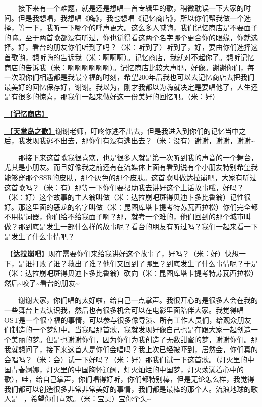 \documentclass[]{ctexbook}
\begin{document}
  接下来有一个难题，就是还是想唱一首专辑里的歌，稍微耽误一下大家的时间。但是我想唱，我想唱《嗨》，我也想唱《记忆商店》，所以你们帮我做一个选择，等一下，我听一下哪个的呼声更大。这么多人喊嗨，我们记忆商店是不要面子的嘛。至于两首歌都没有听过，你也觉得看这两个名字哪个更合你的眼缘，你就选择。好，看台的朋友你们听到了吗？（米：听到了）听到了，好，要由你们选择这首歌哟，想听嗨的告诉我（米：啊啊啊）。记忆商店，我就对不起你了。想听记忆商店的告诉我（米：啊啊啊啊啊啊）。记忆商店比较大声耶，好像。谢谢你们，每一次跟你们相遇都是我最幸福的时刻，希望200年后我也可以去记忆商店去把我们最美好的回忆保存好，谢谢。我以为，刚才我都以为嗨就决定是要唱他了，人生还是有很多的惊喜，那我们一起来做好这一份美好的回忆吧。（米：好）

\hyperref[the-memory-store]{🎵【\textbf{记忆商店}】}

\hyperref[haven-song]{🎵【\textbf{天堂岛之歌}】}谢谢老师，叮咚你逃不出去，但是我进入到你们的记忆当中之后，我发现我逃不出去，那你们有没有逃出去？（米：没有）谢谢，谢谢，谢谢\textasciitilde{}

  那接下来这首歌我很喜欢，也是很多人就是第一次听到我的声音的一个舞台，尤其是小朋友。而且好像我之前还有在流媒体上面有看到说有个小朋友特别希望我能够穿那个SSR的皮肤，那个灰色的那个皮肤。这首歌叫做达拉崩吧，大家有听过这首歌吗？（米：有）那等一下你们要帮助我去讲好这个土话故事哦，好吗？（米：好）这个故事的主人翁叫做（米：达拉崩吧斑得贝迪卜多比鲁翁）记性很好。那这里面的恶龙的名字叫做（米：昆图库塔卡提考特苏瓦西拉松）你们完全都不用提词器，你们给不给我面子啊？那，就考一个难的，他们回到的那个城市叫做？那到底是发生一部什么样的故事呢？看台的朋友有听过吗？我们一起来看一下是发生了什么事情吧？

\hyperref[dalabengba]{🎵【\textbf{达拉崩吧}】}现在需要你们来给我讲好这个故事了，好吗？（米：好）快想一下，是谁打败了谁？救出了谁？他们又回到了哪里？到底发生了什么事情呢？于是（米：达拉崩吧斑得贝迪卜多比鲁翁）砍向（米：昆图库塔卡提考特苏瓦西拉松）然后\textasciitilde 咬了\textasciitilde 看台的朋友\textasciitilde{}

  谢谢大家，你们唱的太好啦，给自己一点掌声。我很开心的是很多人会在我的一些舞台上去认识我，然后也有很多机会可以在电影里面陪伴大家。我觉得唱OST是一个很幸福的事情，可以参与很多像导演、所有工作人员们，给观众朋友们制造的一个梦幻中。当我唱那首歌，我就发现好像自己也是在跟大家一起创造一个美丽的梦。但是也谢谢你们，因为你们为我创造了无数甜蜜的梦，谢谢你们。那我就想问了，接下来这首人是你们会唱吗？我上次已经被吓到，居然会，你们真的会唱吗？（米：会）试一下好吗？（米：好）那我们试一下这首歌。（灯火里的中国青春婀娜，灯火里的中国胸怀辽阔，灯火灿烂的中国梦，灯火荡漾着心中的歌），哇，给自己掌声，你们唱得好听，你们都特别棒，但是无论怎么样，我觉得我们都可以创造很多非常非常美好的事情，我们都是最棒的那个人。流浪地球的歌人是\_，希望你们喜欢。（米：宝贝）宝你个头\textasciitilde{}
\end{document}
